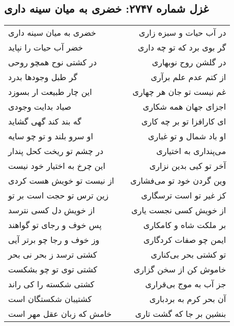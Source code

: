 \begin{center}
\section*{غزل شماره ۲۷۴۷: خضری به میان سینه داری}
\label{sec:2747}
\begin{longtable}{l p{0.5cm} r}
خضری به میان سینه داری
&&
در آب حیات و سبزه زاری
\\
خضر آب حیات را نپاید
&&
گر بوی برد که تو چه داری
\\
در کشتی نوح همچو روحی
&&
در گلشن روح نوبهاری
\\
گر طبل وجودها بدرد
&&
از کتم عدم علم برآری
\\
این چار طبیعت ار بسوزد
&&
غم نیست تو جان هر چهاری
\\
صیاد بدایت وجودی
&&
اجزای جهان همه شکاری
\\
گه بند کند گهی گشاید
&&
ای کارافزا تو بر چه کاری
\\
او سرو بلند و تو چو سایه
&&
او باد شمال و تو غباری
\\
در چشم تو ریخت کحل پندار
&&
می‌پنداری به اختیاری
\\
این چرخ به اختیار خود نیست
&&
آخر تو کیی بدین نزاری
\\
از نیست تو خویش هست کردی
&&
وین گردن خود تو می‌فشاری
\\
زین ترس تو حجت است بر تو
&&
کز غیر تو است ترسگاری
\\
از خویش دل کسی نترسد
&&
از خویش کسی نجست یاری
\\
پس خوف و رجای تو گواهند
&&
بر ملکت شاه و کامکاری
\\
وز خوف و رجا چو برتر آیی
&&
ایمن چو صفات کردگاری
\\
کشتی ترسد ز بحر نی بحر
&&
تو کشتی بحر بی‌کناری
\\
کشتی توی تو چو بشکست
&&
خاموش کن از سخن گزاری
\\
کشتی شکسته را کی راند
&&
جز آب به موج بی‌قراری
\\
کشتیبان شکستگان است
&&
آن بحر کرم به بردباری
\\
خامش که زبان عقل مهر است
&&
بنشین بر جا که گشت تاری
\\
\end{longtable}
\end{center}
